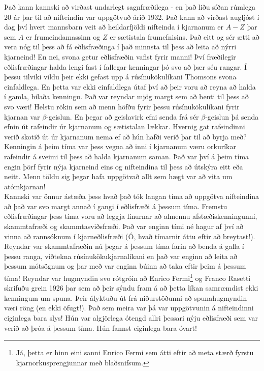 Það kann kannski að virðast undarlegt sagnfræðilega - en það liðu síðan rúmlega 20 ár þar til að nifteindin var uppgötvuð árið 1932. Það kann að virðast augljóst í dag því hvert mannsbarn veit að heildarfjöldi nifteinda í kjarnanum er $A-Z$ þar sem $A$ er frumeindamassinn og $Z$ er sætistala frumefnisins. Það eitt og sér ætti að vera nóg til þess að fá eðlisfræðinga í það minnsta til þess að leita að nýrri kjarneind! En nei, svona getur eðlisfræðin vafist fyrir manni! Því fræðilegir eðlisfræðingar halda lengi fast í fallegar kenningar þó svo að þær séu rangar. Í þessu tilviki vildu þeir ekki gefast upp á rúsínukökulíkani Thomsons svona einfaldlega. En þetta var ekki einfaldlega útaf því að þeir voru að reyna að halda í gamla, bilaða kenningu. Það var reyndar mjög margt sem að benti til þess að svo væri! Helstu rökin sem að menn höfðu fyrir þessu rúsínukökulíkani fyrir kjarnan var $\beta$-geislun. En þegar að geislavirk efni senda frá sér $\beta$-geislun þá senda efnin út rafeindir úr kjarnanum og sætistalan lækkar. Hvernig gat rafeindinni verið skotið út úr kjarnanum nema ef að hún hafði verið þar til að byrja með? Kenningin á þeim tíma var þess vegna að inni í kjarnanum væru orkuríkar rafeindir á sveimi til þess að halda kjarnanum saman. Það var því á þeim tíma engin þörf fyrir nýja kjarneind eins og nifteindina til þess að útskýra eitt eða neitt. Menn töldu sig þegar hafa uppgötvað allt sem hægt var að vita um atómkjarnan! \\

Kannski var önnur ástæða þess hvað það tók langan tíma að uppgötva nifteindina að það var svo margt annað í gangi í eðlisfræði á þessum tíma. Fremstu eðlisfræðingar þess tíma voru að leggja línurnar að almennu afstæðiskenningunni, skammtafræði og skammtasviðsfræði. Það var enginn tími né hagur af því að vinna að rannsóknum í kjarneðlisfræði (Ó, hvað tímarnir áttu eftir að breytast!). Reyndar var skammtafræðin nú þegar á þessum tíma farin að benda á galla í þessu ranga, viðtekna rúsínukökukjarnalíkani en það var enginn að leita að þessum mótsögnum og þar með var enginn búinn að taka eftir þeim á þessum tíma! Reyndar var hugmyndin svo rótgróin að Enrico Fermi\footnote{Já, þetta er hinn eini sanni Enrico Fermi sem átti eftir að meta stærð fyrstu kjarnorkusprengjunnar með blaðsnifsum.} og Franco Rasetti skrifuðu grein 1926 þar sem að þeir sýndu fram á að þetta líkan samræmdist ekki kenningum um spuna. Þeir ályktuðu út frá niðurstöðunni að spunahugmyndin væri röng (en ekki öfugt!). Það sem meira var þá var uppgötvunin á nifteindinni eiginlega bara slys! Hún var algjörlega ótengd allri þessari nýju eðlisfræði sem var verið að þróa á þessum tíma. Hún fannst eiginlega bara óvart! \\

